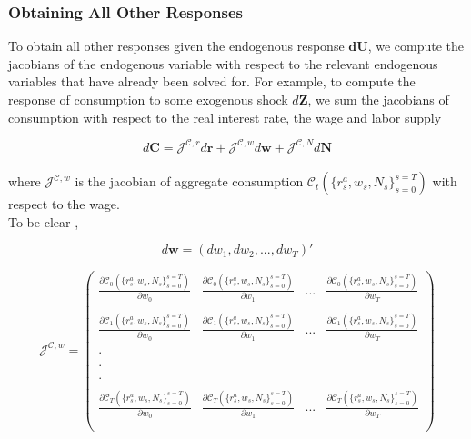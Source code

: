 \documentclass[titlepage]{\econtex}\providecommand{\texname}{BufferStockTheory}
\begin{document}
 
 
 
\hypertarget{Obtaining All Other Responses}{}
\subsubsection{Obtaining All Other Responses} 

To obtain all other responses given the endogenous response $\mathbf{dU}$, we compute the jacobians of the endogenous variable with respect to the relevant endogenous variables that have already been solved for.  For example, to compute the response of consumption to some exogenous shock $d\mathbf{Z}$, we sum  the jacobians of consumption with respect to the real interest rate, the wage and labor supply 

$$ d\mathbf{C} = \mathcal{J}^{\mathcal{C} , r} d\mathbf{r} +\mathcal{J}^{\mathcal{C} , w} d\mathbf{w} +\mathcal{J}^{\mathcal{C} , N} d\mathbf{N} $$\\
 
 where $\mathcal{J}^{\mathcal{C} , w} $ is the jacobian of aggregate consumption  $\mathcal{C}_{t}(\{r_{s}^{a} ,w_{s}, N_{s}\}_{s=0}^{s=T}) $  with respect to the wage. \\
 
 To be clear , 
 
$$d\mathbf{w} =  ( dw_{1}, dw_{2}, . . . , dw_{T})' $$
 
 
 
 $$\mathcal{J}^{\mathcal{C} , w} =   \begin{pmatrix} 
\frac{ \partial \mathcal{C}_{0}(\{r_{s}^{a} ,w_{s}, N_{s}\}_{s=0}^{s=T})}{\partial w_{0}}  & \frac{ \partial \mathcal{C}_{0}(\{r_{s}^{a} ,w_{s}, N_{s}\}_{s=0}^{s=T})}{\partial w_{1}}&    ... & \frac{ \partial \mathcal{C}_{0}(\{r_{s}^{a} ,w_{s}, N_{s}\}_{s=0}^{s=T})}{\partial w_{T}} \\ \\ 
\frac{ \partial \mathcal{C}_{1}(\{r_{s}^{a} ,w_{s}, N_{s}\}_{s=0}^{s=T})}{\partial w_{0}}  &\frac{ \partial \mathcal{C}_{1}(\{r_{s}^{a} ,w_{s}, N_{s}\}_{s=0}^{s=T})}{\partial w_{1}}& ... & \frac{ \partial \mathcal{C}_{1}(\{r_{s}^{a} ,w_{s}, N_{s}\}_{s=0}^{s=T})}{\partial w_{T}} \\ \\
.  \\ \\
.  \\ \\
. \\ \\
\frac{ \partial \mathcal{C}_{T}(\{r_{s}^{a} ,w_{s}, N_{s}\}_{s=0}^{s=T})}{\partial w_{0}}  &\frac{ \partial \mathcal{C}_{T}(\{r_{s}^{a} ,w_{s}, N_{s}\}_{s=0}^{s=T})}{\partial w_{1}}& ... & \frac{ \partial \mathcal{C}_{T}(\{r_{s}^{a} ,w_{s}, N_{s}\}_{s=0}^{s=T})}{\partial w_{T}}  \\ \\
 \end{pmatrix} $$ \\
 
\end{document}
